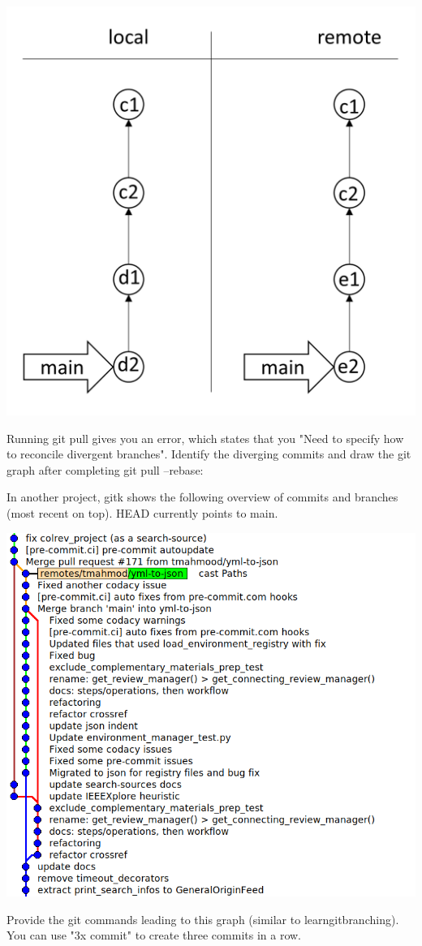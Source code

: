 \documentclass[12pt]{scrartcl}
\begin{document}
\begin{center}
\includegraphics[scale=0.5]{git-graph_1.png}
\end{center}

\noindent
Running git pull gives you an error, which states that you "Need to specify how to reconcile divergent branches". Identify the diverging commits and draw the git graph after completing git pull --rebase:

\vspace{10cm}
\newpage
\noindent
In another project, gitk shows the following overview of commits and branches (most recent on top). HEAD currently points to main.

\vspace{0.5cm}

\includegraphics[scale=0.5]{gitk.png}

\vspace{0.5cm}

\noindent
Provide the git commands leading to this graph (similar to learngitbranching). You can use "3x commit" to create three commits in a row. 

\end{document}
